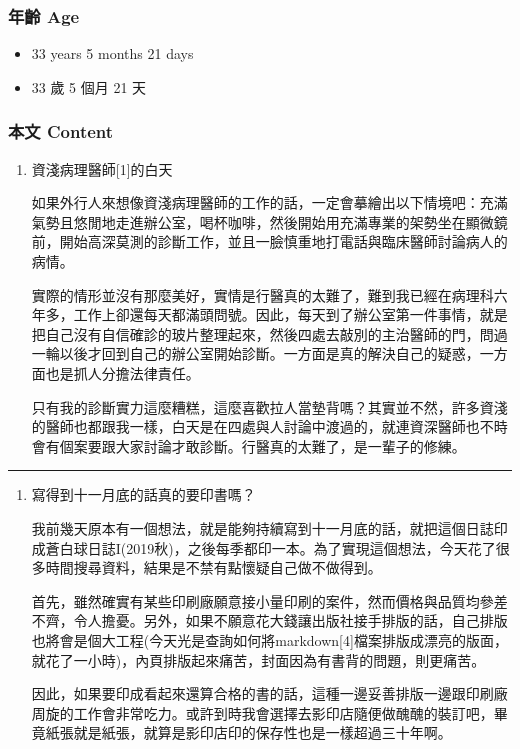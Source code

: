 \documentclass[
]{article}
\providecommand{\tightlist}{%
  \setlength{\itemsep}{0pt}\setlength{\parskip}{0pt}}
\begin{document}
\hypertarget{ux5e74ux9f61-age-13}{%
\subsubsection{年齡 Age}\label{ux5e74ux9f61-age-13}}

\begin{itemize}
\tightlist
\item
  33 years 5 months 21 days
\item
  33 歲 5 個月 21 天
\end{itemize}

\hypertarget{ux672cux6587-content-13}{%
\subsubsection{本文 Content}\label{ux672cux6587-content-13}}

\begin{enumerate}
\def\labelenumi{\arabic{enumi}.}
\item
  資淺病理醫師{[}1{]}的白天

  如果外行人來想像資淺病理醫師的工作的話，一定會摹繪出以下情境吧：充滿氣勢且悠閒地走進辦公室，喝杯咖啡，然後開始用充滿專業的架勢坐在顯微鏡前，開始高深莫測的診斷工作，並且一臉慎重地打電話與臨床醫師討論病人的病情。

  實際的情形並沒有那麼美好，實情是行醫真的太難了，難到我已經在病理科六年多，工作上卻還每天都滿頭問號。因此，每天到了辦公室第一件事情，就是把自己沒有自信確診的玻片整理起來，然後四處去敲別的主治醫師的門，問過一輪以後才回到自己的辦公室開始診斷。一方面是真的解決自己的疑惑，一方面也是抓人分擔法律責任。

  只有我的診斷實力這麼糟糕，這麼喜歡拉人當墊背嗎？其實並不然，許多資淺的醫師也都跟我一樣，白天是在四處與人討論中渡過的，就連資深醫師也不時會有個案要跟大家討論才敢診斷。行醫真的太難了，是一輩子的修練。
\end{enumerate}

\begin{center}\rule{0.5\linewidth}{\linethickness}\end{center}

\begin{enumerate}
\def\labelenumi{\arabic{enumi}.}
\setcounter{enumi}{1}
\item
  寫得到十一月底的話真的要印書嗎？

  我前幾天原本有一個想法，就是能夠持續寫到十一月底的話，就把這個日誌印成蒼白球日誌I(2019秋)，之後每季都印一本。為了實現這個想法，今天花了很多時間搜尋資料，結果是不禁有點懷疑自己做不做得到。

  首先，雖然確實有某些印刷廠願意接小量印刷的案件，然而價格與品質均參差不齊，令人擔憂。另外，如果不願意花大錢讓出版社接手排版的話，自己排版也將會是個大工程(今天光是查詢如何將markdown{[}4{]}檔案排版成漂亮的版面，就花了一小時)，內頁排版起來痛苦，封面因為有書背的問題，則更痛苦。

  因此，如果要印成看起來還算合格的書的話，這種一邊妥善排版一邊跟印刷廠周旋的工作會非常吃力。或許到時我會選擇去影印店隨便做醜醜的裝訂吧，畢竟紙張就是紙張，就算是影印店印的保存性也是一樣超過三十年啊。
\end{enumerate}
\end{document}
